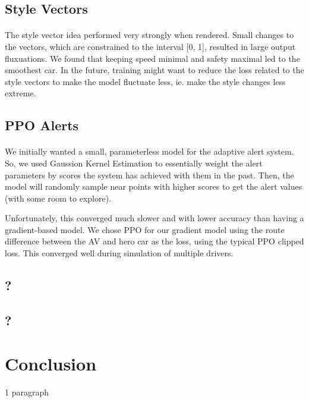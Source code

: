 \documentclass{article}
\begin{document}
\subsection{Style Vectors}
\paragraph{}
The style vector idea performed very strongly when rendered. Small changes 
to the vectors, which are constrained to the interval [0, 1], resulted in large 
output fluxuations. We found that keeping speed minimal and safety maximal led
to the smoothest car. In the future, training might want to reduce the loss 
related to the style vectors to make the model fluctuate less, ie. make the 
style changes less extreme.
\subsection{PPO Alerts}
\paragraph{}
We initially wanted a small, parameterless model for the adaptive alert system. So, we used Gaussion Kernel Estimation to essentially
weight the alert parameters by scores the system has achieved with them in the past. Then, the model will randomly sample near points
with higher scores to get the alert values (with some room to explore). 

Unfortunately, this converged much slower and with lower accuracy
than having a gradient-based model. We chose PPO for our gradient model using the route difference between the AV and hero car as the loss, 
using the typical PPO clipped loss. This converged well during simulation of multiple drivers.

\subsection{?}
\subsection{?}

\section{Conclusion}

1 paragraph
\end{document}
